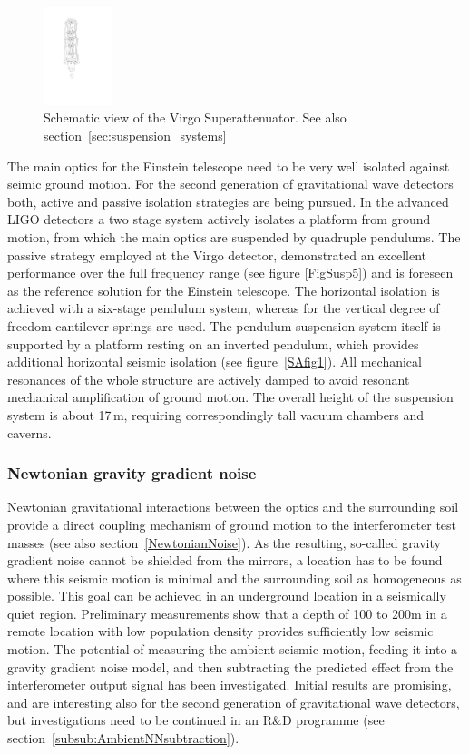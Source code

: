 \begin{figure}
	\centering
		\includegraphics[width=0.18\textwidth]{./Sec_Introduction/VirgoSA.pdf}
	\caption{Schematic view of the Virgo Superattenuator. See also section~\ref{sec:suspension_systems}}
\end{figure} 

The main optics for the Einstein telescope need to be very well isolated against seimic ground motion. For the second generation of gravitational wave detectors both, active and passive isolation strategies are being pursued. In the advanced LIGO detectors a two stage system actively isolates a platform from ground motion, from which the main optics are suspended by quadruple pendulums. The passive strategy employed at the Virgo detector, demonstrated an excellent performance over the full frequency range (see figure \ref{FigSusp5}) and is foreseen as the reference solution for the Einstein telescope. The horizontal isolation is achieved with a six-stage pendulum system, whereas for the vertical degree of freedom cantilever springs  are used. The pendulum suspension system itself is supported by a platform resting on an inverted pendulum, which provides additional horizontal seismic isolation (see figure~\ref{SAfig1}). All mechanical resonances of the whole structure are actively damped to avoid resonant mechanical amplification of ground motion. The overall height of the suspension system is about 17\,m, requiring correspondingly tall vacuum chambers and caverns.

\subsubsection{Newtonian gravity gradient noise}
 Newtonian gravitational interactions between the optics and the surrounding soil provide a direct coupling mechanism of ground motion to the interferometer test masses (see also section~\ref{NewtonianNoise}). As the resulting, so-called gravity gradient noise cannot be shielded from the mirrors, a location has to be found where this seismic motion is minimal and the surrounding soil as homogeneous as possible. This goal can be achieved in an underground location in a seismically quiet region. Preliminary measurements show that a depth of 100 to 200m in a remote location with low population density provides sufficiently low seismic motion. The potential of measuring the ambient seismic motion, feeding it into a gravity gradient noise model, and then subtracting the predicted effect from the interferometer output signal has been investigated. Initial results are promising, and are interesting also for the second generation of gravitational wave detectors, but investigations need to be continued in an R\&D programme (see section~\ref{subsub:AmbientNNsubtraction}).
 
